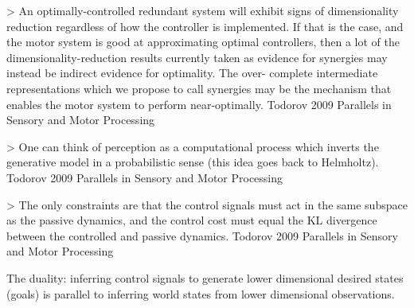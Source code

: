 \documentclass[../main.tex]{subfiles}
\begin{document}
{{> An optimally-controlled redundant system will exhibit signs of dimensionality reduction regardless of how the controller is implemented. If that is the case, and the motor system is good at approximating optimal controllers, then a lot of the dimensionality-reduction results currently taken as evidence for synergies may instead be indirect evidence for optimality. The over- complete intermediate representations which we propose to call synergies may be the mechanism that enables the motor system to perform near-optimally. Todorov 2009 Parallels in Sensory and Motor Processing



> One can think of perception as a computational process which inverts the generative model in a probabilistic sense (this idea goes back to Helmholtz). Todorov 2009 Parallels in Sensory and Motor Processing



> The only constraints are that the control signals must act in the same subspace as the passive dynamics, and the control cost must equal the KL divergence between the controlled and passive dynamics. Todorov 2009 Parallels in Sensory and Motor Processing



The duality: inferring control signals to generate lower dimensional desired states (goals) is parallel to inferring world states from lower dimensional observations.



}}
\end{document}
